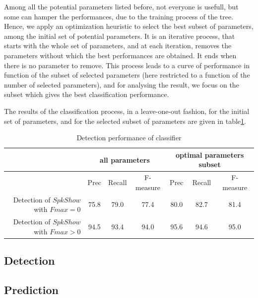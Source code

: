 Among all the potential parameters listed before, not everyone is usefull, but some can hamper the performances, due to the training process of the tree. Hence, we apply an optimization heuristic to select the best subset of parameters, among the initial set of potential parameters. It is an iterative process, that starts with the whole set of parameters, and at each iteration, removes the parameters without which the best performances are obtained. It ends when there is no parameter to remove. This process leads to a curve of performance in function of the subset of selected parameters (here restricted to a function of the number of selected parameters), and for analysing the result, we focus on the subset which gives the best classification performance.

 The results of the classification process, in a leave-one-out fashion, for the initial set of parameters, and for the selected subset of parameters are given in table\ref{tableresult}.
\begin{table}[t]
\begin{center}
\begin{tabular}{r||c|c|c||c|c|c|}
& \multicolumn{3}{c}{all parameters}& \multicolumn{3}{c}{optimal parameters subset}\\\hline
& Prec & Recall & F-measure & Prec & Recall & F-measure \\\hline
Detection of $SpkShow$ with $Fmax=0$ & 75.8 & 79.0 & 77.4 & 80.0 & 82.7 & 81.4 \\\hline
Detection of $SpkShow$ with $Fmax>0$ & 94.5 & 93.4 & 94.0 & 95.6 & 94.6 & 95.0 \\\hline
\end{tabular}
\caption{Detection performance of classifier}
\label{tableresult}
\end{center}
\end{table}


\subsection{Detection}


\subsection{Prediction}



